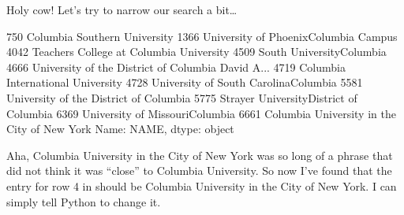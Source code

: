 \documentclass[letterpaper,10pt,english]{sphinxmanual}
\begin{document}
Holy cow!  Let’s try to narrow our search a bit…

\begin{sphinxVerbatim}[commandchars=\\\{\}]
\PYG{p}{[}\PYG{p}{[}\PYG{p}{]}  
      \PYG{p}{[}\PYG{p}{]}  \PYG{p}{]}\PYG{p}{[}\PYG{p}{]}
\end{sphinxVerbatim}

\begin{sphinxVerbatim}[commandchars=\\\{\}]
750                          Columbia Southern University
1366                University of Phoenix\PYGZhy{}Columbia Campus
4042              Teachers College at Columbia University
4509                            South University\PYGZhy{}Columbia
4666    University of the District of Columbia David A...
4719                    Columbia International University
4728                University of South Carolina\PYGZhy{}Columbia
5581               University of the District of Columbia
5775              Strayer University\PYGZhy{}District of Columbia
6369                      University of Missouri\PYGZhy{}Columbia
6661          Columbia University in the City of New York
Name: NAME, dtype: object
\end{sphinxVerbatim}

Aha, Columbia University in the City of New York was so long of a phrase that  did not think it was “close” to Columbia University.  So now I’ve found that the entry for row 4 in  should be Columbia University in the City of New York.  I can simply tell Python to change it.

\begin{sphinxVerbatim}[commandchars=\\\{\}]
\PYG{p}{[}\PYG{p}{]}  
\end{sphinxVerbatim}
\end{document}
